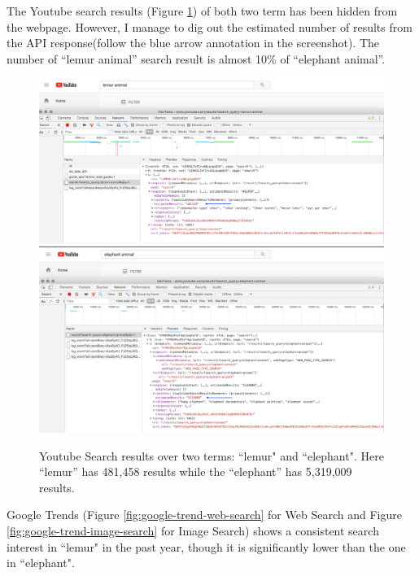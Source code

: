 \documentclass{article}
\begin{document}
The Youtube search results (Figure \ref{fig:youtube-search}) of both two term has been hidden from the webpage. However, I manage to dig out the estimated number of results from the API response(follow the blue arrow annotation in the screenshot). The number of ``lemur animal'' search result is almost 10\% of ``elephant animal''.

\begin{figure}[h]
  \includegraphics[width=\linewidth]{img/youtube-lemur-animal.png}
  \includegraphics[width=\linewidth]{img/youtube-elephant-animal.png}
  \caption{Youtube Search results over two terms: ``lemur" and ``elephant". Here ``lemur'' has 481,458 results while the ``elephant'' has 5,319,009 results.}
  \label{fig:youtube-search}
\end{figure}

Google Trends (Figure \ref{fig:google-trend-web-search} for Web Search and Figure \ref{fig:google-trend-image-search} for Image Search) shows a consistent search interest in ``lemur" in the past year, though it is significantly lower than the one in ``elephant".
\end{document}
